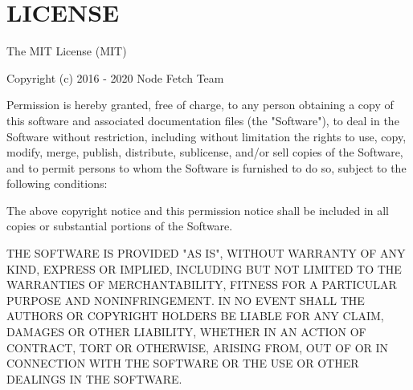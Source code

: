 \chapter{LICENSE}
\hypertarget{md_node__modules_2_0dshadcn_2ui_2node__modules_2node-fetch_2_l_i_c_e_n_s_e}{}\label{md_node__modules_2_0dshadcn_2ui_2node__modules_2node-fetch_2_l_i_c_e_n_s_e}
The MIT License (MIT)

Copyright (c) 2016 -\/ 2020 Node Fetch Team

Permission is hereby granted, free of charge, to any person obtaining a copy of this software and associated documentation files (the "{}\+Software"{}), to deal in the Software without restriction, including without limitation the rights to use, copy, modify, merge, publish, distribute, sublicense, and/or sell copies of the Software, and to permit persons to whom the Software is furnished to do so, subject to the following conditions\+:

The above copyright notice and this permission notice shall be included in all copies or substantial portions of the Software.

THE SOFTWARE IS PROVIDED "{}\+AS IS"{}, WITHOUT WARRANTY OF ANY KIND, EXPRESS OR IMPLIED, INCLUDING BUT NOT LIMITED TO THE WARRANTIES OF MERCHANTABILITY, FITNESS FOR A PARTICULAR PURPOSE AND NONINFRINGEMENT. IN NO EVENT SHALL THE AUTHORS OR COPYRIGHT HOLDERS BE LIABLE FOR ANY CLAIM, DAMAGES OR OTHER LIABILITY, WHETHER IN AN ACTION OF CONTRACT, TORT OR OTHERWISE, ARISING FROM, OUT OF OR IN CONNECTION WITH THE SOFTWARE OR THE USE OR OTHER DEALINGS IN THE SOFTWARE. 